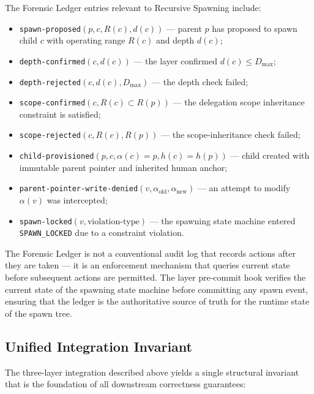 The Forensic Ledger entries relevant to Recursive Spawning include:
\begin{itemize}\itemsep=0pt
  \item \texttt{spawn-proposed}$(p, c, R(c), d(c))$ — parent $p$ has proposed
    to spawn child $c$ with operating range $R(c)$ and depth $d(c)$;
  \item \texttt{depth-confirmed}$(c, d(c))$ — the \Bounds{} layer confirmed
    $d(c) \leq D_{\max}$;
  \item \texttt{depth-rejected}$(c, d(c), D_{\max})$ — the depth check failed;
  \item \texttt{scope-confirmed}$(c, R(c) \subset R(p))$ — the delegation scope
    inheritance constraint is satisfied;
  \item \texttt{scope-rejected}$(c, R(c), R(p))$ — the scope-inheritance check
    failed;
  \item \texttt{child-provisioned}$(p, c, \alpha(c) = p, h(c) = h(p))$ — child
    created with immutable parent pointer and inherited human anchor;
  \item \texttt{parent-pointer-write-denied}$(v, \alpha_{\text{old}},
    \alpha_{\text{new}})$ — an attempt to modify $\alpha(v)$ was intercepted;
  \item \texttt{spawn-locked}$(v, \text{violation-type})$ — the spawning state
    machine entered \texttt{SPAWN\_LOCKED} due to a constraint violation.
\end{itemize}

The Forensic Ledger is not a conventional audit log that records actions
after they are taken — it is an enforcement mechanism that queries current
state before subsequent actions are permitted.  The \Fact{} layer pre-commit hook
verifies the current state of the spawning state machine before committing any
spawn event, ensuring that the ledger is the authoritative source of truth for
the runtime state of the spawn tree.

\subsection{Unified Integration Invariant}
\label{sec:rs-unified-inv}

The three-layer integration described above yields a single structural invariant
that is the foundation of all downstream correctness guarantees:

